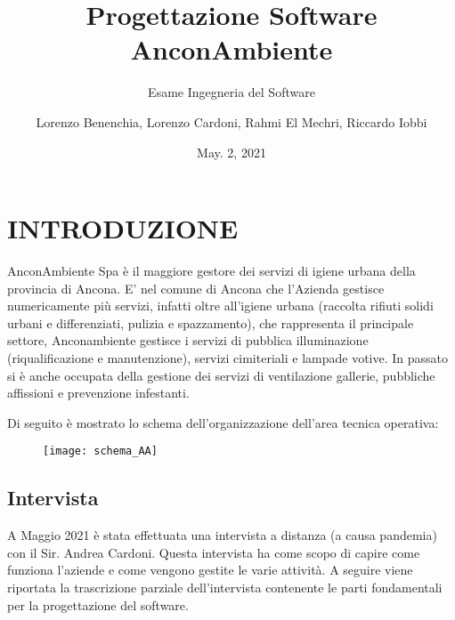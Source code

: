 \documentclass[green, fancy, 11pt]{elegantbook}
\title{Progettazione Software AnconAmbiente}
\subtitle{Esame Ingegneria del Software}
\author{Lorenzo Benenchia, Lorenzo Cardoni, Rahmi El Mechri, Riccardo Iobbi}
\institute{UNIVPM}
\date{May. 2, 2021}
\begin{document}
\maketitle
\frontmatter
\tableofcontents
\mainmatter

\chapter{INTRODUZIONE}
\noindent AnconAmbiente Spa è il maggiore gestore dei servizi di igiene urbana della provincia di Ancona.
\noindent E’ nel comune di Ancona che l’Azienda gestisce numericamente più servizi, infatti oltre all’igiene urbana (raccolta rifiuti solidi urbani e differenziati, pulizia e spazzamento), che rappresenta il principale settore, Anconambiente gestisce i servizi di pubblica illuminazione (riqualificazione e manutenzione), servizi cimiteriali e lampade votive. In passato si è anche occupata della gestione dei servizi di ventilazione gallerie, 
pubbliche affissioni e prevenzione infestanti.

\noindent Di seguito è mostrato lo schema dell'organizzazione dell'area tecnica operativa:\\

\begin{figure}
	\texttt{[image: schema\_AA]}\\
\end{figure}
\newpage

\section{Intervista}
A Maggio 2021 è stata effettuata una intervista a distanza (a causa pandemia) con il Sir. Andrea Cardoni.
Questa intervista ha come scopo di capire come funziona l'aziende e come vengono gestite le varie attività.
A seguire viene riportata la trascrizione parziale dell'intervista contenente le parti fondamentali per la progettazione del software.
\end{document}

